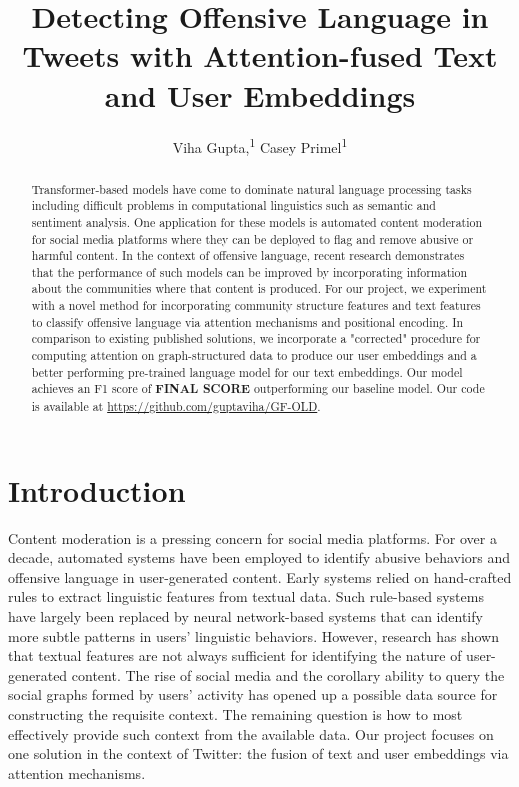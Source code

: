 \documentclass[letterpaper]{article} %
\title{Detecting Offensive Language in Tweets with Attention-fused Text and User Embeddings}
\author {
    Viha Gupta,\textsuperscript{\rm 1}
    Casey Primel\textsuperscript{\rm 1}
}
\begin{document}
\maketitle

\begin{abstract}
    Transformer-based models have come to dominate natural language processing tasks including difficult problems in computational linguistics such as semantic and sentiment analysis. One application for these models is automated content moderation for social media platforms where they can be deployed to flag and remove abusive or harmful content. In the context of offensive language, recent research demonstrates that the performance of such models can be improved by incorporating information about the communities where that content is produced. For our project, we experiment with a novel method for incorporating community structure features and text features to classify offensive language via attention mechanisms and positional encoding. In comparison to existing published solutions, we incorporate a "corrected" procedure for computing attention on graph-structured data to produce our user embeddings and a better performing pre-trained language model for our text embeddings. Our model achieves an F1 score of \textbf{FINAL SCORE} outperforming our baseline model. Our code is available at \url{https://github.com/guptaviha/GF-OLD}.
\end{abstract}

\section{Introduction}

Content moderation is a pressing concern for social media platforms. For over a decade, automated systems have been employed to identify abusive behaviors and offensive language in user-generated content. Early systems relied on hand-crafted rules to extract linguistic features from textual data. Such rule-based systems have largely been replaced by neural network-based systems that can identify more subtle patterns in users' linguistic behaviors. However, research has shown that textual features are not always sufficient for identifying the nature of user-generated content. The rise of social media and the corollary ability to query the social graphs formed by users' activity has opened up a possible data source for constructing the requisite context. The remaining question is how to most effectively provide such context from the available data. Our project focuses on one solution in the context of Twitter: the fusion of text and user embeddings via attention mechanisms.
\end{document}
